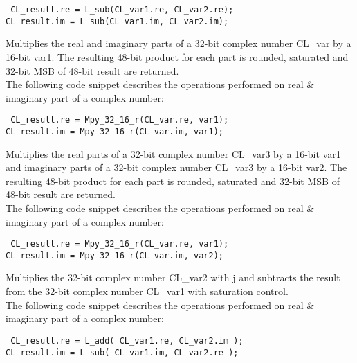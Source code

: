 {\tt {} CL\_result.re = L\_sub(CL\_var1.re, CL\_var2.re);\\
      CL\_result.im = L\_sub(CL\_var1.im, CL\_var2.im);
}


Multiplies the real and imaginary parts of a 32-bit complex number CL\_var by a 16-bit var1.
The resulting 48-bit product for each part is rounded, saturated and 32-bit MSB of 48-bit result are returned.\\
The following code snippet describes the operations performed on real \& imaginary part of a complex number:

{\tt {} CL\_result.re = Mpy\_32\_16\_r(CL\_var.re, var1);\\
      CL\_result.im = Mpy\_32\_16\_r(CL\_var.im, var1);
}


Multiplies the real parts of a 32-bit complex number CL\_var3 by a 16-bit var1 and imaginary parts of a 32-bit complex number CL\_var3 by a 16-bit var2.
The resulting 48-bit product for each part is rounded, saturated and 32-bit MSB of 48-bit result are returned.\\
The following code snippet describes the operations performed on real \& imaginary part of a complex number:

{\tt {} CL\_result.re = Mpy\_32\_16\_r(CL\_var.re, var1);\\
      CL\_result.im = Mpy\_32\_16\_r(CL\_var.im, var2);
}


Multiplies the 32-bit complex number CL\_var2 with j and subtracts the result from the 32-bit complex number CL\_var1 with saturation control.\\
The following code snippet describes the operations performed on real \& imaginary part of a complex number:

{\tt {} CL\_result.re = L\_add( CL\_var1.re, CL\_var2.im );\\
      CL\_result.im = L\_sub( CL\_var1.im, CL\_var2.re );
}


